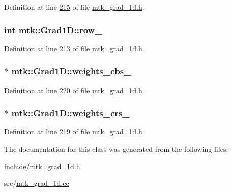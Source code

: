 Definition at line \hyperlink{mtk__grad__1d_8h_source_l00215}{215} of file \hyperlink{mtk__grad__1d_8h_source}{mtk\+\_\+grad\+\_\+1d.\+h}.

\hypertarget{classmtk_1_1Grad1D_a7947235d61d0dd27c5b81a81ca78d9a8}{
\subsubsection[{row\+\_\+}]{\setlength{\rightskip}{0pt plus 5cm}int mtk\+::\+Grad1\+D\+::row\+\_\+\hspace{0.3cm}{\ttfamily [private]}}}\label{classmtk_1_1Grad1D_a7947235d61d0dd27c5b81a81ca78d9a8}


Definition at line \hyperlink{mtk__grad__1d_8h_source_l00213}{213} of file \hyperlink{mtk__grad__1d_8h_source}{mtk\+\_\+grad\+\_\+1d.\+h}.

\hypertarget{classmtk_1_1Grad1D_ae6b0a908748923b2acd97e5bf7acc000}{
\subsubsection[{weights\+\_\+cbs\+\_\+}]{$\ast$ mtk\+::\+Grad1\+D\+::weights\+\_\+cbs\+\_\+\hspace{0.3cm}{\ttfamily [private]}}}\label{classmtk_1_1Grad1D_ae6b0a908748923b2acd97e5bf7acc000}


Definition at line \hyperlink{mtk__grad__1d_8h_source_l00220}{220} of file \hyperlink{mtk__grad__1d_8h_source}{mtk\+\_\+grad\+\_\+1d.\+h}.

\hypertarget{classmtk_1_1Grad1D_a96914abea78528b32499963ce9bbe4a6}{
\subsubsection[{weights\+\_\+crs\+\_\+}]{$\ast$ mtk\+::\+Grad1\+D\+::weights\+\_\+crs\+\_\+\hspace{0.3cm}{\ttfamily [private]}}}\label{classmtk_1_1Grad1D_a96914abea78528b32499963ce9bbe4a6}


Definition at line \hyperlink{mtk__grad__1d_8h_source_l00219}{219} of file \hyperlink{mtk__grad__1d_8h_source}{mtk\+\_\+grad\+\_\+1d.\+h}.



The documentation for this class was generated from the following files\+:\begin{DoxyCompactItemize}
\item 
include/\hyperlink{mtk__grad__1d_8h}{mtk\+\_\+grad\+\_\+1d.\+h}\item 
src/\hyperlink{mtk__grad__1d_8cc}{mtk\+\_\+grad\+\_\+1d.\+cc}\end{DoxyCompactItemize}
